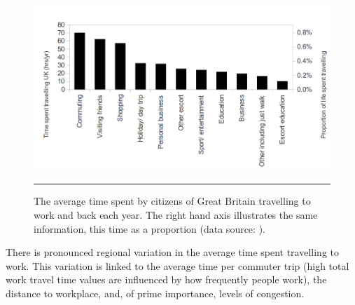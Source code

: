 \begin{figure}[htbp]
  \centerline{
    \includegraphics[width = 14 cm]{./Figures/time-commuting}}
    \rule{35em}{0.5pt}
  \caption[Time spent commuting in Great Britain]{The average time spent by
citizens of Great Britain travelling to work and back each year. The right hand
axis illustrates the same information, this time as a proportion (data
source: \citealp{NTS2012-time-travel}).}
  \label{fig:t-commuting}
\end{figure}

There is pronounced regional variation in the average time spent travelling to
work. This variation is linked to the average time per commuter trip (high
total work travel time values are influenced by how frequently people work),
the distance to workplace, and, of prime importance, levels of congestion.


